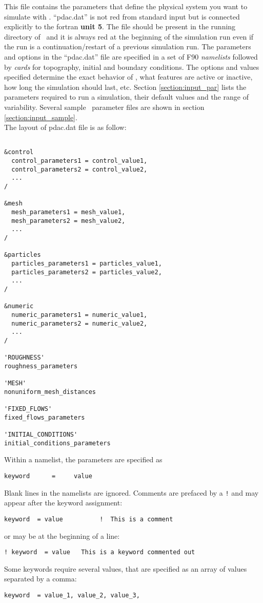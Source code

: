 This file contains the parameters that define the physical system
you want to simulate with \PDAC. ``pdac.dat'' is not red from standard 
input but is connected explicitly to the fortran {\bf unit 5}. The file should
be present in the running directory of \PDAC\, and it is always red
at the beginning of the simulation run even if the run is a 
continuation/restart of a previous simulation run. 
The parameters and options in the ``pdac.dat'' file are specified
in a set of F90 {\em namelists} followed by {\em cards} for topography, 
initial and boundary conditions.
The options and values specified determine the exact behavior of
\PDAC, what features are active or inactive, how long the simulation
should last, etc.  
Section \ref{section:input_par} lists the parameters required to run a 
simulation, their default values and the range of variability.
Several sample \PDAC\ parameter files are shown in section 
\ref{section:input_sample}.\\

The layout of pdac.dat file is as follow:

\begin{verbatim}

&control
  control_parameters1 = control_value1,
  control_parameters2 = control_value2,
  ...
/

&mesh
  mesh_parameters1 = mesh_value1,
  mesh_parameters2 = mesh_value2,
  ...
/

&particles
  particles_parameters1 = particles_value1,
  particles_parameters2 = particles_value2,
  ...
/

&numeric
  numeric_parameters1 = numeric_value1,
  numeric_parameters2 = numeric_value2,
  ...
/

'ROUGHNESS'
roughness_parameters

'MESH'
nonuniform_mesh_distances

'FIXED_FLOWS'
fixed_flows_parameters

'INITIAL_CONDITIONS'
initial_conditions_parameters

\end{verbatim}

Within a namelist, the parameters are specified as
\begin{verbatim}
keyword      =     value
\end{verbatim}
Blank lines in the namelists are ignored.  Comments are prefaced by
a {\tt !} and may appear after the keyword assignment:
\begin{verbatim}
keyword  = value          !  This is a comment
\end{verbatim}
or may be at the beginning of a line:
\begin{verbatim}
! keyword  = value   This is a keyword commented out
\end{verbatim}
Some keywords require several values, that are specified as an array of values
separated by a comma:
\begin{verbatim}
keyword  = value_1, value_2, value_3,
\end{verbatim}

